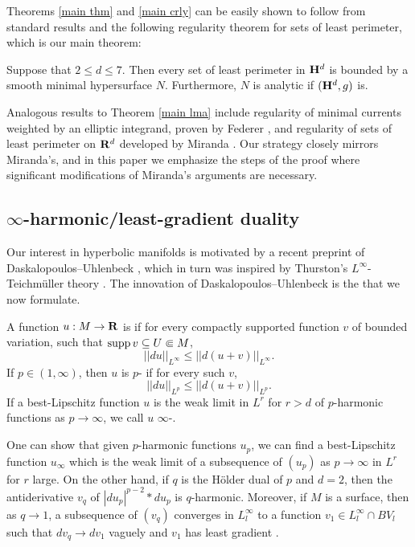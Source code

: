 Theorems \ref{main thm} and \ref{main crly} can be easily shown to follow from standard results and the following regularity theorem for sets of least perimeter, which is our main theorem:

\begin{theorem}\label{main lma}
Suppose that $2 \leq d \leq 7$.
Then every set of least perimeter in $\mathbf H^d$ is bounded by a smooth minimal hypersurface $N$.
Furthermore, $N$ is analytic if $(\mathbf H^d, g)$ is.
\end{theorem}

Analogous results to Theorem \ref{main lma} include regularity of minimal currents weighted by an elliptic integrand, proven by Federer \cite[\S5.3]{federer2014geometric}, and regularity of sets of least perimeter on $\mathbf{R}^d$ developed by Miranda \cite{Miranda64} \cite{Miranda66} \cite{Miranda67}.
Our strategy closely mirrors Miranda's, and in this paper we emphasize the steps of the proof where significant modifications of Miranda's arguments are necessary.


\subsection{$\infty$-harmonic/least-gradient duality}
Our interest in hyperbolic manifolds is motivated by a recent preprint of Daskalopoulos--Uhlenbeck \cite{daskalopoulos2020transverse}, which in turn was inspired by Thurston's $L^\infty$-Teichm\"uller theory \cite{thurston1998minimal}.
The innovation of Daskalopoulos--Uhlenbeck is the  that we now formulate.

\begin{definition}
A function $u: M \to \mathbf{R}$ is  if for every compactly supported function $v$ of bounded variation, such that $\operatorname{supp} v \subseteq U \Subset M$,
$$||du||_{L^\infty} \leq ||d(u + v)||_{L^\infty}.$$
If $p \in (1, \infty)$, then $u$ is $p$- if for every such $v$,
$$||du||_{L^p} \leq ||d(u + v)||_{L^p}.$$
If a best-Lipschitz function $u$ is the weak limit in $L^r$ for $r > d$ of $p$-harmonic functions as $p \to \infty$, we call $u$ $\infty$-.
\end{definition}

One can show \cite[Theorem 2.4]{daskalopoulos2020transverse} that given $p$-harmonic functions $u_p$, we can find a best-Lipschitz function $u_\infty$ which is the weak limit of a subsequence of $(u_p)$ as $p \to \infty$ in $L^r$ for $r$ large.
On the other hand, if $q$ is the H\"older dual of $p$ and $d = 2$, then the antiderivative $v_q$ of $|du_p|^{p - 2} * du_p$ is $q$-harmonic.
Moreover, if $M$ is a surface, then as $q \to 1$, a subsequence of $(v_q)$ converges in $L^\infty_l$ to a function $v_1 \in L^\infty_l \cap BV_l$ such that $dv_q \to dv_1$ vaguely and $v_1$ has least gradient \cite[Theorem 6.10]{daskalopoulos2020transverse}.

